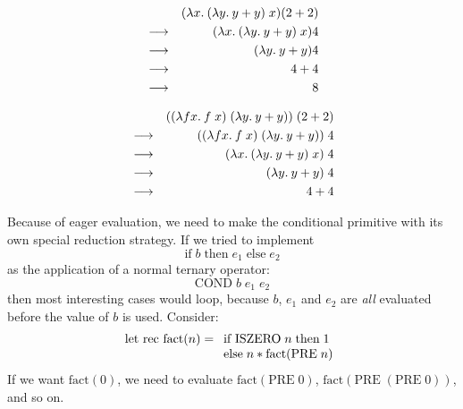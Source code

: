 \begin{slide*}


\vspace*{0.5cm}

\begin{red}
\begin{eqnarray*}
& & (\lambda x.\: (\lambda y.\: y + y)\; x) (2 + 2)     \\
& \longrightarrow & (\lambda x.\: (\lambda y.\: y + y)\; x) 4   \\
& \longrightarrow & (\lambda y.\: y + y) 4                  \\
& \longrightarrow & 4 + 4                               \\
& \longrightarrow & 8
\end{eqnarray*}

\begin{eqnarray*}
& & ((\lambda f x.\: f\; x)\; (\lambda y.\: y + y))\; (2 + 2)             \\
& \longrightarrow & ((\lambda f x.\: f\; x)\; (\lambda y.\: y + y))\; 4           \\
& \longrightarrow & (\lambda x.\: (\lambda y.\: y + y)\; x)\; 4                   \\
& \longrightarrow & (\lambda y.\: y + y)\; 4                                  \\
& \longrightarrow & 4 + 4
\end{eqnarray*}
\end{red}

\end{slide*}



\begin{slide*}


\vspace*{0.5cm}

Because of eager evaluation, we need to make the conditional primitive with its
own special reduction strategy. If we tried to implement
{\red $$ \mbox{if}\; b\; \mbox{then}\; e_1\; \mbox{else}\; e_2 $$}
as the application of a normal ternary operator:
{\red $$ \mbox{COND}\; b\; e_1\; e_2 $$}
then most interesting cases would loop, because $b$, $e_1$ and $e_2$ are {\em
all} evaluated before the value of $b$ is used. Consider:
{\red $$ \mbox{let rec fact}(n) = \begin{array}[t]{l} \mbox{if ISZERO}\; n\;
                           \mbox{then}\; 1\\
         \mbox{else}\; n * \mbox{fact}(\mbox{PRE}\; n) \end{array} $$}
If we want {\red $\mbox{fact}(0)$}, we need to evaluate {\red
$\mbox{fact}(\mbox{PRE}\; 0)$}, {\red $\mbox{fact}(\mbox{PRE}\; (\mbox{PRE}\;
0))$}, and so on.

\end{slide*}



